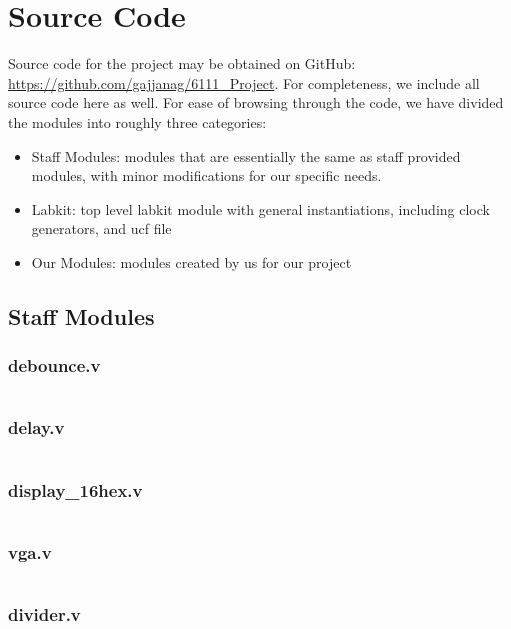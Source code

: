 \documentclass{article}
\begin{document}
\appendix

\section{Source Code}
Source code for the project may be obtained on GitHub: \url{https://github.com/gajjanag/6111_Project}.
For completeness, we include all source code here as well.
For ease of browsing through the code, we have divided the modules into roughly three categories:
\begin{itemize}
\item Staff Modules: modules that are essentially the same as staff provided modules, with minor modifications for our specific needs.
\item Labkit: top level labkit module with general instantiations, including clock generators, and ucf file
\item Our Modules: modules created by us for our project
\end{itemize}

\subsection{Staff Modules}
\subsubsection{debounce.v}
\inputminted[linenos]{verilog}{../../src/debounce.v}
\subsubsection{delay.v}
\inputminted[linenos]{verilog}{../../src/delay.v}
\subsubsection{display\_16hex.v}
\inputminted[linenos]{verilog}{../../src/display_16hex.v}
\subsubsection{vga.v}
\inputminted[linenos]{verilog}{../../src/vga.v}
\subsubsection{divider.v}
\inputminted[linenos]{verilog}{../../src/divider.v}
\end{document}
